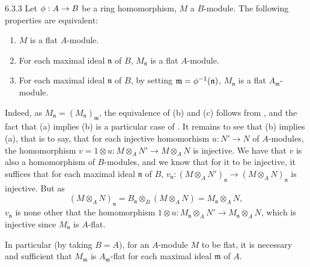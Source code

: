 \begin{env}{6.3.3}
\label{env-0.6.3.3}
Let $\phi:A\to B$ be a ring homomorphism, $M$ a $B$-module. The following
properties are equivalent:
\begin{enumerate}[label=(\alph*)]
  \item $M$ is a flat $A$-module.
  \item For each maximal ideal $\mathfrak{n}$ of $B$, $M_\mathfrak{n}$ is a flat
        $A$-module.
  \item For each maximal ideal $\mathfrak{n}$ of $B$, by setting
        $\mathfrak{m}=\phi^{-1}(\mathfrak{n})$, $M_\mathfrak{n}$ is a flat
        $A_\mathfrak{m}$-module.
\end{enumerate}

Indeed, as $M_\mathfrak{n}=(M_\mathfrak{n})_\mathfrak{m}$, the equivalence of
(b) and (c) follows from , and the fact that (a) implies (b) is
a particular case of . It remains to see that (b) implies (a),
that is to say, that for each injective homomorhism $u:N'\to N$ of $A$-modules, the
homomorphism $v=1\otimes u:M\otimes_A N'\to M\otimes_A N$ is injective. We have that $v$ is
also a homomorphism of $B$-modules, and we know that for it to be injective, it suffices that
for each maximal ideal $\mathfrak{n}$ of $B$,
$v_\mathfrak{n}:(M\otimes_A N')_\mathfrak{n}\to(M\otimes_A N)_\mathfrak{n}$ is injective. But
as
\[
  (M\otimes_A N)_\mathfrak{n}=B_\mathfrak{n}\otimes_B(M\otimes_A N)
  =M_\mathfrak{n}\otimes_A N,
\]
$v_\mathfrak{n}$ is none other that the homomorphism
$1\otimes u:M_\mathfrak{n}\otimes_A N'\to M_\mathfrak{n}\otimes_A N$, which is injective
since $M_\mathfrak{n}$ is $A$-flat.

In particular (by taking $B=A$), for an $A$-module $M$ to be flat, it is necessary and
sufficient that $M_\mathfrak{m}$ is $A_\mathfrak{m}$-flat for each maximal ideal
$\mathfrak{m}$ of $A$.
\end{env}

